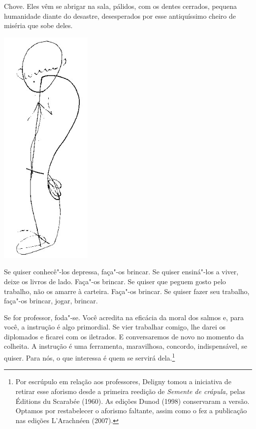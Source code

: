 \bigskip
\bigskip

Chove. Eles vêm se abrigar na sala, pálidos, com os dentes cerrados,
pequena humanidade diante do desastre, desesperados por esse
antiquíssimo cheiro de miséria que sobe deles.

\bigskip
\bigskip


\pagebreak
\thispagestyle{empty}

\begin{vplace}[.50]
\begin{center}
\includegraphics[width=45mm]{./imgs/Image_4.jpg}
\end{center}
\end{vplace}

\pagebreak

Se quiser conhecê"-los depressa, faça"-os brincar. Se quiser ensiná"-los a
viver, deixe os livros de lado. Faça"-os brincar. Se quiser que peguem
gosto pelo trabalho, não os amarre à carteira. Faça"-os brincar. Se
quiser fazer seu trabalho, faça"-os brincar, jogar, brincar.

\bigskip
\bigskip

Se for professor, foda"-se. Você acredita na eficácia da moral dos salmos
e, para você, a instrução é algo primordial. Se vier trabalhar comigo,
lhe darei os diplomados e ficarei com os iletrados. E conversaremos de
novo no momento da colheita. A instrução é uma ferramenta, maravilhosa,
concordo, indispensável, se quiser. Para nós, o que interessa é quem se
servirá dela.\footnote{Por escrúpulo em relação aos professores, Deligny
  tomou a iniciativa de retirar esse aforismo desde a primeira reedição
  de \emph{Semente de crápula,} pelas Éditions du Scarabée (1960). As
  edições Dunod (1998) conservaram a versão. Optamos por restabelecer o
  aforismo faltante, assim como o fez a publicação nas edições
  L'Arachnéen (2007).}

